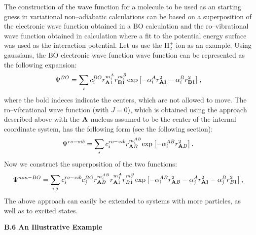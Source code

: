 The construction of the wave function for a molecule 
to be used as an
starting guess in variational non--adiabatic calculations
can be based on a superposition of the electronic wave function
obtained in a BO calculation and the ro--vibrational wave function
obtained in calculation where a fit to the potential energy
surface was used as the interaction potential. Let us use the H$_2^+$
ion as an example. Using gaussians, the BO electronic wave function 
wave function can be represented as the following expansion:
\begin{equation}
\Psi^{BO} = 
\sum_i c_i^{BO} r_{ {\bf A}1}^{m_i^A} r_{ {\bf B}1}^{m_i^B}
{\rm exp} \left[ -\alpha_i^A r_{ {\bf A}1}^2 
- \alpha_i^B r_{ {\bf B}1}^2 \right],
\label{BO1}
\end{equation}
where the bold indeces indicate the centers, which are not allowed to move.
The ro--vibrational wave function (with $J=0$), which is obtained using the
approach described above with the ${\bf A}$ nucleus assumed to be
the center of the internal coordinate system, has the following form
(see the following section):
\begin{equation}
\Psi^{ro-vib} = 
\sum_i c_i^{ro-vib} r_{ {\bf A}B}^{m_i^{AB}} 
{\rm exp} \left[ -\alpha_i^{AB} r_{ {\bf A}B}^2 \right].
\label{BO2}
\end{equation}
Now we construct the superposition of the two functions:
\begin{equation}
\Psi^{non-BO} = 
\sum_{i,j} c_i^{ro-vib} c_j^{BO} 
r_{ {\bf A}B}^{m_i^{AB}}
r_{ {\bf A}1}^{m_j^A} r_{B1}^{m_j^B}
{\rm exp} 
\left[ -\alpha_i^{AB} r_{ {\bf A}B}^2 -\alpha_j^A r_{ {\bf A}1}^2 
- \alpha_j^B r_{B1}^2 \right],
\label{BO3}
\end{equation}
The above approach can easily be extended to systems with more particles,
as well as to excited states.



\vspace{2mm}
\noindent
{\bf B.6 An Illustrative Example}


